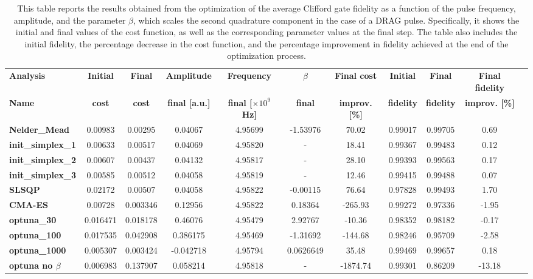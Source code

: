 \begin{table}
    \centering
    \begin{tabular}{lcccccccccc}
        \toprule
        \textbf{Analysis} & \textbf{Initial} & \textbf{Final} & \textbf{Amplitude} & \textbf{Frequency} & \textbf{$\beta$} & \textbf{Final cost} & \textbf{Initial} & \textbf{Final} & \textbf{Final fidelity} \\
        \textbf{Name} & \textbf{cost} & \textbf{cost} & \textbf{final [a.u.]} & \textbf{final [$\times10^9$ Hz]} & \textbf{final} & \textbf{improv. [\%]} & \textbf{fidelity} & \textbf{fidelity} & \textbf{improv. [\%]} \\
        \midrule
        \textbf{Nelder\_Mead} & 0.00983 & 0.00295 & 0.04067 & 4.95699 & -1.53976 & 70.02 & 0.99017 & 0.99705 & 0.69 \\
        \textbf{init\_simplex\_1} & 0.00633 & 0.00517 & 0.04069 & 4.95820 & - & 18.41 & 0.99367 & 0.99483 & 0.12 \\
        \textbf{init\_simplex\_2} & 0.00607 & 0.00437 & 0.04132 & 4.95817 & - & 28.10 & 0.99393 & 0.99563 & 0.17 \\
        \textbf{init\_simplex\_3} & 0.00585 & 0.00512 & 0.04058 & 4.95819 & - & 12.46 & 0.99415 & 0.99488 & 0.07 \\
        \textbf{SLSQP} & 0.02172 & 0.00507 & 0.04058 & 4.95822 & -0.00115 & 76.64 & 0.97828 & 0.99493 & 1.70 \\
        \textbf{CMA-ES} & 0.00728 & 0.003346 & 0.12956 & 4.95822 & 0.18364 & -265.93 & 0.99272 & 0.97336 & -1.95 \\
        \textbf{optuna\_30} & 0.016471 & 0.018178 & 0.46076 & 4.95479 & 2.92767 & -10.36 & 0.98352 & 0.98182 & -0.17\\
        \textbf{optuna\_100} & 0.017535 & 0.042908 &  0.386175 & 4.95469 & -1.31692 & -144.68 & 0.98246 & 0.95709 & -2.58\\
        \textbf{optuna\_1000} & 0.005307 & 0.003424 & -0.042718 & 4.95794 & 0.0626649 & 35.48 & 0.99469 & 0.99657 & 0.18\\
        \textbf{optuna no $\beta$} & 0.006983 & 0.137907 & 0.058214 & 4.95818 & - & -1874.74 & 0.99301 & 0.86209 & -13.18\\
        \bottomrule
    \end{tabular}
    \caption{This table reports the results obtained from the optimization of the average Clifford gate fidelity as a function of the pulse frequency, amplitude, and the parameter $\beta$, which scales the second quadrature component in the case of a DRAG pulse.
    Specifically, it shows the initial and final values of the cost function, as well as the corresponding parameter values at the final step. 
    The table also includes the initial fidelity, the percentage decrease in the cost function, and the percentage improvement in fidelity achieved at the end of the optimization process.}
    \label{tab:final_values}
\end{table}

